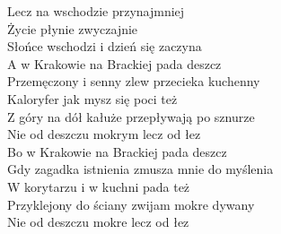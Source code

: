 \documentclass[a5paper, 10pt]{book}
\begin{document}
\begin{minipage}[t]{0.8\textwidth}
Lecz na wschodzie przynajmniej\\
Życie płynie zwyczajnie\\
Słońce wschodzi i dzień się zaczyna\vspace*{2mm}\\
\hspace*{5mm}A w Krakowie na Brackiej pada deszcz\\
\hspace*{5mm}Przemęczony i senny zlew przecieka kuchenny\\
\hspace*{5mm}Kaloryfer jak mysz się poci też\\
\hspace*{5mm}Z góry na dół kałuże przepływają po sznurze\\
\hspace*{5mm}Nie od deszczu mokrym lecz od łez\vspace*{2mm}\\
\hspace*{5mm}Bo w Krakowie na Brackiej pada deszcz\\
\hspace*{5mm}Gdy zagadka istnienia zmusza mnie do myślenia\\
\hspace*{5mm}W korytarzu i w kuchni pada też\\
\hspace*{5mm}Przyklejony do ściany zwijam mokre dywany\\
\hspace*{5mm}Nie od deszczu mokre lecz od łez\vspace*{2mm}\\
\end{minipage}
\end{document}
